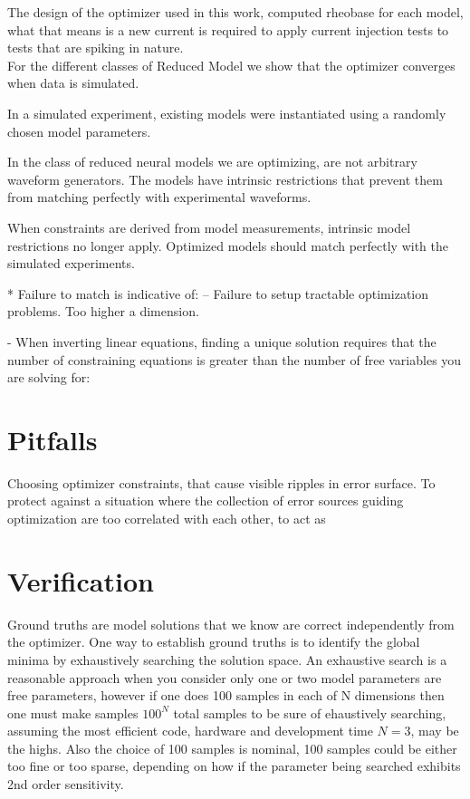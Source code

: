 The design of the optimizer used in this work, computed rheobase for each model, what that means is a new current is required to apply current injection tests to tests that are spiking in nature.\\


For the different classes of Reduced Model we show that the optimizer converges when data is simulated.

In a simulated experiment, existing models were instantiated using a randomly chosen model parameters.

In the class of reduced neural models we are optimizing, are not arbitrary waveform generators. The models have intrinsic restrictions that prevent them from matching perfectly with experimental waveforms.

When constraints are derived from model measurements, intrinsic model restrictions no longer apply. Optimized models should match perfectly with the simulated experiments. 

* Failure to match is indicative of: -- Failure to setup tractable optimization problems. Too higher a dimension.

- When inverting linear equations, finding a unique solution requires that the number of constraining equations is greater than the number of free variables you are solving for:

\section{Pitfalls}
Choosing optimizer constraints, that cause visible ripples in error surface.
To protect against a situation where the collection of error sources guiding optimization are too correlated with each other, to act as 


\section{Verification}
Ground truths are model solutions that we know are correct independently from the optimizer. One way to establish ground truths is to identify the global minima by exhaustively searching the solution space. An exhaustive search is a reasonable approach when you consider only one or two model parameters are free parameters, however if one does 100 samples in each of N dimensions then one must make samples $100^{N}$ total samples to be sure of ehaustively searching, assuming the most efficient code, hardware and development time $N=3$, may be the highs.  Also the choice of 100 samples is nominal, 100 samples could be either too fine or too sparse, depending on how if the parameter being searched exhibits 2nd order sensitivity.

